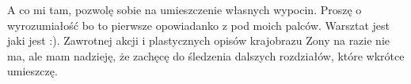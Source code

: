\documentclass[../MAIN.tex]{subfiles}
\begin{document}
A co mi tam, pozwolę sobie na umieszczenie własnych wypocin. Proszę o wyrozumiałość bo to pierwsze opowiadanko z pod moich palców. Warsztat jest jaki jest  :). Zawrotnej akcji i plastycznych opisów krajobrazu Zony na razie nie ma, ale mam nadzieję, że zachęcę do śledzenia dalszych rozdziałów, które wkrótce umieszczę.
\end{document}
